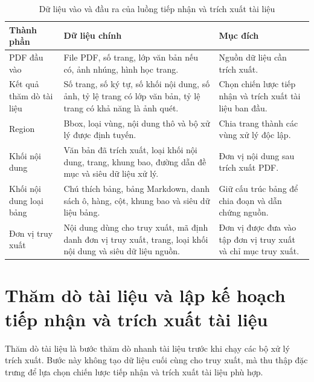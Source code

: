 \documentclass[../DoAn.tex]{subfiles}
\begin{document}
\begin{table}[H]
\centering
\small
\renewcommand{\arraystretch}{1.2}
\caption{Dữ liệu vào và đầu ra của luồng tiếp nhận và trích xuất tài liệu}
\label{tab:ingest-input-output}
\begin{tabularx}{\textwidth}{
    |>{\raggedright\arraybackslash}p{}
    |>{\raggedright\arraybackslash}X
    |>{\raggedright\arraybackslash}p{}|
}
\hline
\textbf{Thành phần} & \textbf{Dữ liệu chính} & \textbf{Mục đích} \\
\hline
PDF đầu vào &
File PDF, số trang, lớp văn bản nếu có, ảnh nhúng, hình học trang. &
Nguồn dữ liệu cần trích xuất. \\
\hline
Kết quả thăm dò tài liệu &
Số trang, số ký tự, số khối nội dung, số ảnh, tỷ lệ trang có lớp văn bản, tỷ lệ trang có khả năng là ảnh quét. &
Chọn chiến lược tiếp nhận và trích xuất tài liệu ban đầu. \\
\hline
Region &
Bbox, loại vùng, nội dung thô và bộ xử lý được định tuyến. &
Chia trang thành các vùng xử lý độc lập. \\
\hline
Khối nội dung &
Văn bản đã trích xuất, loại khối nội dung, trang, khung bao, đường dẫn đề mục và siêu dữ liệu xử lý. &
Đơn vị nội dung sau trích xuất PDF. \\
\hline
Khối nội dung loại bảng &
Chú thích bảng, bảng Markdown, danh sách ô, hàng, cột, khung bao và siêu dữ liệu bảng. &
Giữ cấu trúc bảng để chia đoạn và dẫn chứng nguồn. \\
\hline
Đơn vị truy xuất &
Nội dung dùng cho truy xuất, mã định danh đơn vị truy xuất, trang, loại khối nội dung và siêu dữ liệu nguồn. &
Đơn vị được đưa vào tập đơn vị truy xuất và chỉ mục truy xuất. \\
\hline
\end{tabularx}
\end{table}

\section{Thăm dò tài liệu và lập kế hoạch tiếp nhận và trích xuất tài liệu}
\label{section:probe-ingest-plan}

Thăm dò tài liệu là bước thăm dò nhanh tài liệu trước khi chạy các bộ xử lý trích xuất. Bước
này không tạo dữ liệu cuối cùng cho truy xuất, mà thu thập đặc trưng để lựa chọn
chiến lược tiếp nhận và trích xuất tài liệu phù hợp.
\end{document}
